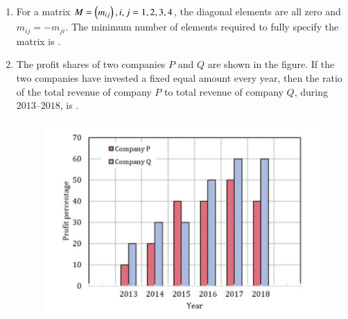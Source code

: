 \documentclass[journal,12pt,onecolumn]{IEEEtran}
\theoremstyle{remark}
\begin{document}
\begin{enumerate}[start=1, label=Q.\arabic*]
\hfill{}

\item For a matrix $M = \left(m_{ij}\right), i,j = 1,2,3,4$, the diagonal elements are all zero and $m_{ij} = -m_{ji}$. The minimum number of elements required to fully specify the matrix is \underline{\hspace{2cm}}.

\begin{enumerate}
\end{enumerate}

\hfill{}

\item The profit shares of two companies $P$ and $Q$ are shown in the figure. If the two companies have invested a fixed equal amount every year, then the ratio of the total revenue of company $P$ to total revenue of company $Q$, during $2013$–$2018$, is \underline{\hspace{2cm}}.

\begin{figure}[H]
\centering
\includegraphics[width=0.7\columnwidth]{Figures/qs10.png}
\caption{}
\end{figure}

\begin{enumerate}
\end{enumerate}


\end{enumerate}
\end{document}
